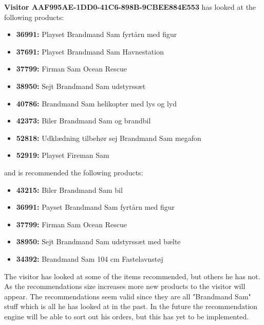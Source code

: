 \textbf{Visitor AAF995AE-1DD0-41C6-898B-9CBEE884E553} has looked at the following products:
\begin{itemize}
\item \textbf{36991: }Playset Brandmand Sam fyrtårn med figur
\item \textbf{37691: }Playset Brandmand Sam Havnestation
\item \textbf{37799: }Firman Sam Ocean Rescue
\item \textbf{38950: }Sejt Brandmand Sam udstyrssæt
\item \textbf{40786: }Brandmand Sam helikopter med lys og lyd
\item \textbf{42373: }Biler Brandmand Sam og brandbil
\item \textbf{52818: }Udklædning tilbehør sej Brandmand Sam megafon
\item \textbf{52919: }Playset Fireman Sam
\end{itemize}
and is recommended the following products:
\begin{itemize}
\item \textbf{43215: }Biler Brandmand Sam bil
\item \textbf{36991: }Payset Brandmand Sam fyrtårn med figur
\item \textbf{37799: }Firman Sam Ocean Rescue
\item \textbf{38950: }Sejt Brandmand Sam udstyrssæt med bælte
\item \textbf{34392:} Brandmand Sam 104 cm Fastelavnstøj
\end{itemize}

The visitor has looked at some of the items recommended, but others he has not. As the recommendations size increases more new products to the visitor will appear. The recommendations seem valid since they are all "Brandmand Sam" stuff which is all he has looked at in the past. In the future the recommendation engine will be able to sort out his orders, but this has yet to be implemented. \\\\

